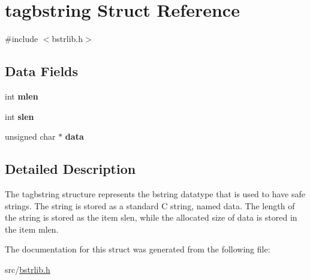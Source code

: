 \hypertarget{structtagbstring}{}\section{tagbstring Struct Reference}
\label{structtagbstring}


{\ttfamily \#include $<$bstrlib.\+h$>$}

\subsection*{Data Fields}
\begin{DoxyCompactItemize}
\item 
\hypertarget{structtagbstring_abf47839da62089f74883d8324f5ef539}{}int {\bfseries mlen}\label{structtagbstring_abf47839da62089f74883d8324f5ef539}

\item 
\hypertarget{structtagbstring_af9a7862da5259ad58776f27cbab88180}{}int {\bfseries slen}\label{structtagbstring_af9a7862da5259ad58776f27cbab88180}

\item 
\hypertarget{structtagbstring_aeacc0105c2eed78dcc0647f89898821f}{}unsigned char $\ast$ {\bfseries data}\label{structtagbstring_aeacc0105c2eed78dcc0647f89898821f}

\end{DoxyCompactItemize}


\subsection{Detailed Description}
The tagbstring structure represents the bstring datatype that is used to have safe strings. The string is stored as a standard C string, named {\ttfamily data}. The length of the string is stored as the item {\ttfamily slen}, while the allocated size of {\ttfamily data} is stored in the item {\ttfamily mlen}. 

The documentation for this struct was generated from the following file\+:\begin{DoxyCompactItemize}
\item 
src/\hyperlink{bstrlib_8h}{bstrlib.\+h}\end{DoxyCompactItemize}
